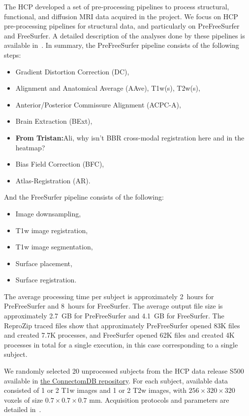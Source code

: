 \documentclass[a4paper,num-refs]{oup-contemporary}
\newcommand{\reprozip}[0]{ReproZip\xspace}
\newcommand{\tristan}[1]{\color{orange}\textbf{From Tristan:}#1\color{black}}
\begin{document}
The HCP developed a set of pre-processing pipelines to process structural,
functional, and diffusion MRI data acquired in the project. We focus on HCP
pre-processing pipelines for structural data, and particularly
on PreFreeSurfer and FreeSurfer. 
A detailed description of the analyses done by these
pipelines is available in~\cite{glasser2013}. 
In summary, the PreFreeSurfer pipeline consists of the following steps: 
\begin{itemize}
\item Gradient Distortion Correction (DC), 
\item Alignment and Anatomical Average (AAve), T1w(s), T2w(s),  
\item Anterior/Posterior Commissure Alignment (ACPC-A), 
\item Brain Extraction (BExt), 
\item \tristan{Ali, why isn't BBR cross-modal registration here and in the heatmap?}
\item Bias Field Correction (BFC), 
\item Atlas-Registration (AR).
\end{itemize}
And the FreeSurfer pipeline consists of the following:
\begin{itemize}
\item Image downsampling, 
\item T1w image registration, 
\item T1w image segmentation,
\item Surface placement, 
\item Surface registration.
\end{itemize}
The average processing time per subject is approximately 2~hours for
PreFreeSurfer and 8~hours for FreeSurfer. The average output file size is
approximately 2.7~GB for PreFreeSurfer and 4.1~GB for FreeSurfer.
The \reprozip traced files show that approximately PreFreeSurfer opened  
83K files and created 7.7K processes, and FreeSurfer opened 62K files and 
created 4K processes in total for a single execution, in this case corresponding to a single subject.

We randomly selected 20 unprocessed subjects 
from the HCP data release S500 
available in \href{https://db.humanconnectome.org}{the ConnectomDB repository}. 
For each subject, available data consisted of 1 or 2 T1w images and 1 or 2 T2w images, with 
$256 \times 320 \times 320$ voxels of size $0.7 \times 0.7 \times 0.7$ mm.
Acquisition protocols and parameters are detailed in~\cite{van2013wu}. 
\end{document}
